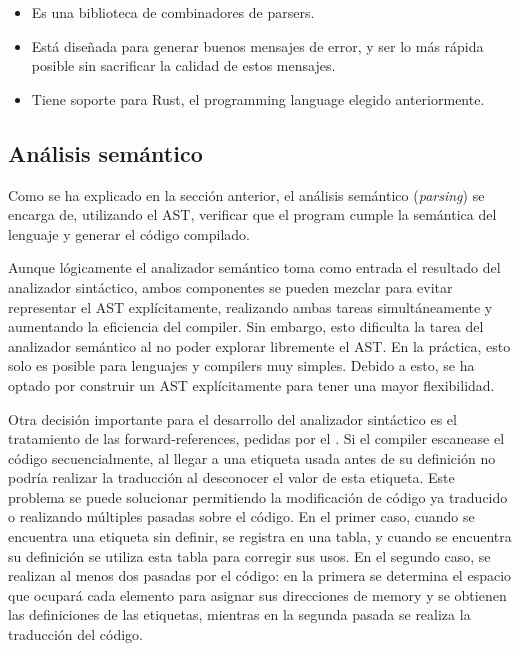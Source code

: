 \begin{itemize}
    \item Es una biblioteca de combinadores de \glspl{parser}.
    \item Está diseñada para generar buenos mensajes de error, y ser lo más
    rápida posible sin sacrificar la calidad de estos mensajes.
    \item Tiene soporte para Rust, el \gls{programming language} elegido
    anteriormente.
\end{itemize}

\subsection{Análisis semántico}\label{subsec:compiler}

Como se ha explicado en la sección anterior, el análisis semántico
(\textit{parsing}) se encarga de, utilizando el \gls{AST}, verificar que el
\gls{program} cumple la semántica del lenguaje y generar el código compilado.

Aunque lógicamente el analizador semántico toma como entrada el resultado del
analizador sintáctico, ambos componentes se pueden mezclar para evitar
representar el \gls{AST} explícitamente, realizando ambas tareas simultáneamente
y aumentando la eficiencia del \gls{compiler}. Sin embargo, esto dificulta la
tarea del analizador semántico al no poder explorar libremente el \gls{AST}. En
la práctica, esto solo es posible para lenguajes y \glspl{compiler} muy simples.
Debido a esto, se ha optado por construir un \gls{AST} explícitamente para tener
una mayor flexibilidad. \parencite{compiler-design}

Otra decisión importante para el desarrollo del analizador sintáctico es el
tratamiento de las \glspl{forward-reference}, pedidas por el
. Si el \gls{compiler} escanease el código secuencialmente,
al llegar a una etiqueta usada antes de su definición no podría realizar la
traducción al desconocer el valor de esta etiqueta. Este problema se puede
solucionar permitiendo la modificación de código ya traducido o realizando
múltiples pasadas sobre el código. En el primer caso, cuando se encuentra una
etiqueta sin definir, se registra en una tabla, y cuando se encuentra su
definición se utiliza esta tabla para corregir sus usos. En el segundo caso, se
realizan al menos dos pasadas por el código: en la primera se determina el
espacio que ocupará cada elemento para asignar sus direcciones de \gls{memory} y
se obtienen las definiciones de las etiquetas, mientras en la segunda pasada se
realiza la traducción del código. \parencite{assembler-design}

